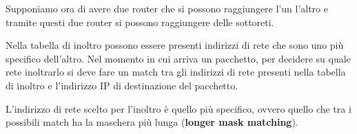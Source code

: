 Supponiamo ora di avere due router che si possono raggiungere l'un
l'altro e tramite questi due router si possono raggiungere delle
sottoreti.

Nella tabella di inoltro possono essere presenti indirizzi di rete che
sono uno più specifico dell'altro. Nel momento in cui arriva un
pacchetto, per decidere su quale rete inoltrarlo si deve fare un match
tra gli indirizzi di rete presenti nella tabella di inoltro e 
l'indirizzo IP di destinazione del pacchetto.

L'indirizzo di rete scelto per l'inoltro è quello più specifico, ovvero
quello che tra i possibili match ha la maschera più lunga
(\textbf{longer mask matching}).

